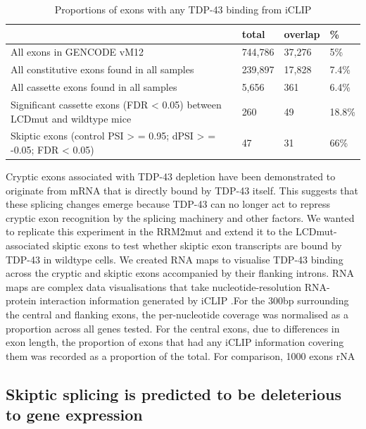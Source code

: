 \begin{table}
	\begin{footnotesize}
	\begin{tabular}{llll}
		& total &	overlap	& \% \\
		\hline
		All exons in GENCODE vM12 &	744,786	& 37,276 & 5\% \\
		All constitutive exons found in all samples	& 239,897	& 17,828	& 7.4\% \\
		All cassette exons found in all samples &	5,656 &	361	& 6.4\% \\
		Significant cassette exons (FDR < 0.05) between LCDmut and wildtype mice	& 260	& 49 & 18.8\% \\
		Skiptic exons (control PSI > = 0.95; dPSI > = -0.05; FDR < 0.05) & 47 &	31 & 66\% \\
	\end{tabular}
	\end{footnotesize}
	\caption{Proportions of exons with any TDP-43 binding from iCLIP}
	\label{tab:iclip_proportions}
\end{table}

Cryptic exons associated with TDP-43 depletion have been demonstrated to originate from mRNA that is directly bound by TDP-43 itself. This suggests that these splicing changes emerge because TDP-43 can no longer act to repress cryptic exon recognition by the splicing machinery and other factors. We wanted to replicate this experiment in the RRM2mut and extend it to the LCDmut-associated skiptic exons to test whether skiptic exon transcripts are bound by TDP-43 in wildtype cells. We created RNA maps to visualise TDP-43 binding across the cryptic and skiptic exons accompanied by their flanking introns. RNA maps are complex data visualisations that take nucleotide-resolution RNA-protein interaction information generated by iCLIP \citep{Huppertz2014-ip}.For the 300bp surrounding the central and flanking exons, the per-nucleotide coverage was normalised as a proportion across all genes tested. For the central exons, due to differences in exon length, the proportion of exons that had any iCLIP information covering them was recorded as a proportion of the total. For comparison, 1000 exons rNA %

\subsection{Skiptic splicing is predicted to be deleterious to gene expression}


